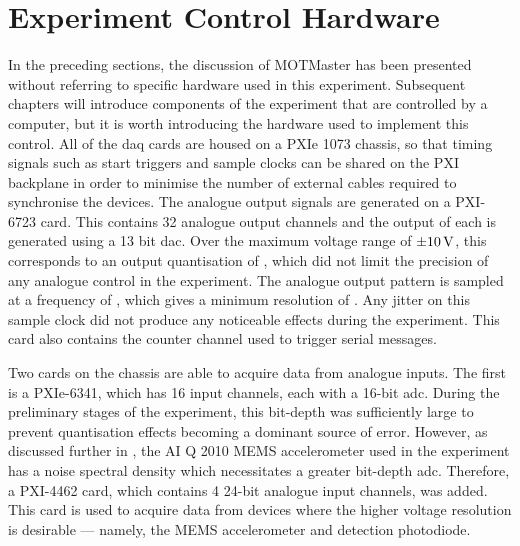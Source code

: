 \section{Experiment Control Hardware}
In the preceding sections, the discussion of MOTMaster has been presented without referring to specific hardware used in this experiment. Subsequent chapters will introduce components of the experiment that are controlled by a computer, but it is worth introducing the hardware used to implement this control. All of the \ac{daq} cards are housed on a PXIe 1073 chassis, so that timing signals such as start triggers and sample clocks can be shared on the PXI backplane in order to minimise the number of external cables required to synchronise the devices. The analogue output signals are generated on a PXI-6723 card. This contains 32 analogue output channels and the output of each is generated using a 13 bit \ac{dac}. Over the maximum voltage range of \(\pm \sivalue{10}{\volt}\), this corresponds to an output quantisation of , which did not limit the precision of any analogue control in the experiment. The analogue output pattern is sampled at a frequency of , which gives a minimum resolution of . Any jitter on this sample clock did not produce any noticeable effects during the experiment. This card also contains the counter channel used to trigger serial messages. \par\noindent
Two cards on the chassis are able to acquire data from analogue inputs. The first is a PXIe-6341, which has 16 input channels, each with a 16-bit \ac{adc}. During the preliminary stages of the experiment, this bit-depth was sufficiently large to prevent quantisation effects becoming a dominant source of error. However, as discussed further in , the AI Q 2010 MEMS accelerometer used in the experiment has a noise spectral density which necessitates a greater bit-depth \ac{adc}. Therefore, a PXI-4462 card, which contains 4 24-bit analogue input channels, was added. This card is used to acquire data from devices where the higher voltage resolution is desirable --- namely, the MEMS accelerometer and detection photodiode.\par\noindent
